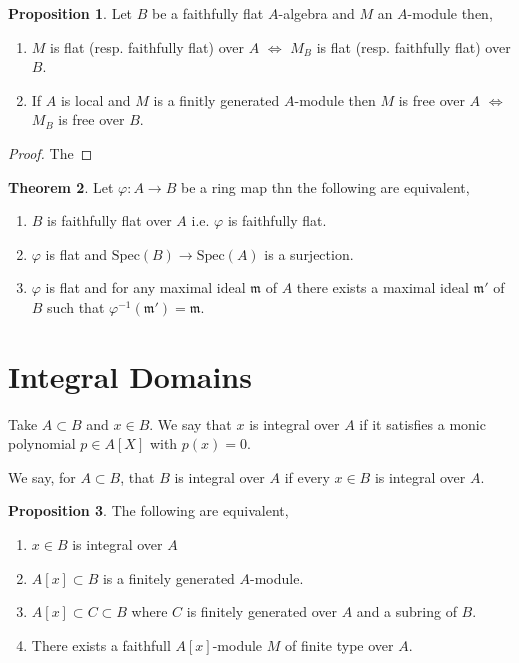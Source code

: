 \documentclass[12pt]{article}
\newcommand{\spec}[1]{\mathrm{Spec}\left( #1 \right)}
\newcommand{\m}{\mathfrak{m}}
\theoremstyle{remark}
\theoremstyle{definition}
\newtheorem{theorem}{Theorem}[section]
\newtheorem{proposition}[theorem]{Proposition}
\newenvironment{definition}[1][Definition:]{\begin{trivlist}
\item[\hskip \labelsep {\bfseries #1}]}{\end{trivlist}}
\begin{document}
\begin{proposition}
Let $B$ be a faithfully flat $A$-algebra and $M$ an $A$-module then,
\begin{enumerate}
\item $M$ is flat (resp. faithfully flat) over $A$ $\iff$ $M_B$ is flat (resp. faithfully flat) over $B$.
\item If $A$ is local and $M$ is a finitly generated $A$-module then $M$ is free over $A$ $\iff$ $M_B$ is free over $B$.   
\end{enumerate}
\end{proposition}

\begin{proof}
The 
\end{proof}

\begin{theorem}
Let $\varphi : A \to B$ be a ring map thn the following are equivalent,
\begin{enumerate}
\item $B$ is faithfully flat over $A$ i.e. $\varphi$ is faithfully flat.

\item $\varphi$ is flat and $\spec{B} \to \spec{A}$ is a surjection.

\item $\varphi$ is flat and for any maximal ideal $\m$ of $A$ there exists a maximal ideal $\m'$ of $B$ such that $\varphi^{-1}(\m') = \m$.
\end{enumerate}
\end{theorem}


\section{Integral Domains}

\begin{definition}
Take $A \subset B$ and $x \in B$. We say that $x$ is integral over $A$ if it satisfies a monic polynomial $p \in A[X]$ with $p(x) = 0$. 
\end{definition}

\begin{definition}
We say, for $A \subset B$, that $B$ is integral over $A$ if every $x \in B$ is integral over $A$.
\end{definition}

\begin{proposition}
The following are equivalent,
\begin{enumerate}
\item $x \in B$ is integral over $A$

\item $A[x] \subset B$ is a finitely generated $A$-module.

\item $A[x] \subset C \subset B$ where $C$ is finitely generated over $A$ and a subring of $B$.  

\item There exists a faithfull $A[x]$-module $M$ of finite type over $A$.
\end{enumerate}
\end{proposition}
\end{document}
